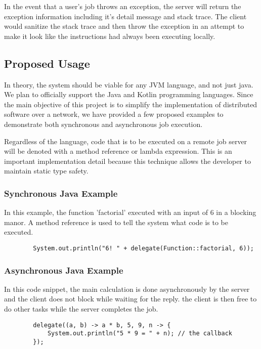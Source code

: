 \documentclass[12pt, oneside,english]{article}
\begin{document}
    In the event that a user's job throws an exception, the server will return
    the exception information including it's detail message and stack trace.
    The client would sanitize the stack trace and then throw the exception
    in an attempt to make it look like the instructions had always been
    executing locally.


    \subsection{Proposed Usage}\label{subsec:proposageUsage}
    In theory, the system should be viable for any JVM language, and not just java.
    We plan to officially support the Java and Kotlin programming languages.
    Since the main objective of this project is to simplify the implementation
    of distributed software over a network, we have provided a few proposed
    examples to demonstrate both synchronous and asynchronous job execution.

    Regardless of the language, code that is to be executed on a remote job
    server will be denoted with a method reference or lambda expression.
    This is an important implementation detail because this technique allows
    the developer to maintain static type safety.

    \subsubsection{Synchronous Java Example}

    In this example, the function 'factorial' executed with an input of 6
    in a blocking manor. A method reference is used to tell the system what
    code is to be executed.

    \begin{lstlisting}
        System.out.println("6! " + delegate(Function::factorial, 6));
    \end{lstlisting}

    \subsubsection{Asynchronous Java Example}

    In this code snippet, the main calculation is done asynchronously
    by the server and the client does not block while waiting for the reply.
    the client is then free to do other tasks while the server completes the job.

    \begin{lstlisting}
        delegate((a, b) -> a * b, 5, 9, n -> {
            System.out.println("5 * 9 = " + n); // the callback
        });
    \end{lstlisting}
\end{document}
